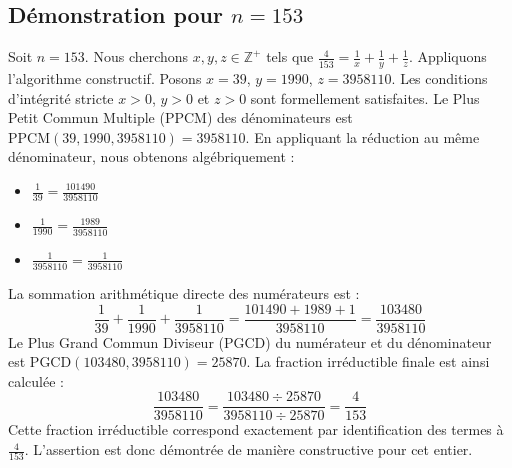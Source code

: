 \documentclass[11pt,a4paper]{article}
\begin{document}
\subsection{Démonstration pour $n = 153$}
Soit $n = 153$. Nous cherchons $x, y, z \in \mathbb{Z}^{+}$ tels que $\frac{4}{153} = \frac{1}{x} + \frac{1}{y} + \frac{1}{z}$.
Appliquons l'algorithme constructif. Posons $x = 39$, $y = 1990$, $z = 3958110$.
Les conditions d'intégrité stricte $x > 0$, $y > 0$ et $z > 0$ sont formellement satisfaites.
Le Plus Petit Commun Multiple (PPCM) des dénominateurs est $\text{PPCM}(39, 1990, 3958110) = 3958110$.
En appliquant la réduction au même dénominateur, nous obtenons algébriquement :
\begin{itemize}
    \item $\frac{1}{39} = \frac{101490}{3958110}$
    \item $\frac{1}{1990} = \frac{1989}{3958110}$
    \item $\frac{1}{3958110} = \frac{1}{3958110}$
\end{itemize}
La sommation arithmétique directe des numérateurs est :
$$ \frac{1}{39} + \frac{1}{1990} + \frac{1}{3958110} = \frac{101490 + 1989 + 1}{3958110} = \frac{103480}{3958110} $$
Le Plus Grand Commun Diviseur (PGCD) du numérateur et du dénominateur est $\text{PGCD}(103480, 3958110) = 25870$.
La fraction irréductible finale est ainsi calculée :
$$ \frac{103480}{3958110} = \frac{103480 \div 25870}{3958110 \div 25870} = \frac{4}{153} $$
Cette fraction irréductible correspond exactement par identification des termes à $\frac{4}{153}$. L'assertion est donc démontrée de manière constructive pour cet entier.
\end{document}
